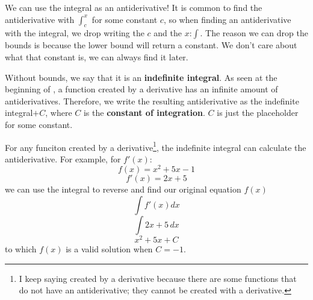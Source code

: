\documentclass[../revisedmain.tex]{subfiles}
\begin{document}
We can use the integral as an antiderivative! It is common to find the antiderivative with $\int_{c}^{x}$ for some constant $c$, so when finding an antiderivative with the integral, we drop writing the $c$ and the $x$:$\int$. The reason we can drop the bounds is because the lower bound will return a constant. We don't care about what that constant is, we can always find it later. \\\par Without bounds, we say that it is an \textbf{indefinite integral}. As seen at the beginning of , a function created by a derivative has an infinite amount of antiderivatives. Therefore, we write the resulting antiderivative as the indefinite integral$+C$, where $C$ is the \textbf{constant of integration}. $C$ is just the placeholder for some constant.\\\par For any funciton created by a derivative\footnote{I keep saying created by a derivative because there are some functions that do not have an antiderivative; they cannot be created with a derivative.}, the indefinite integral can calculate the antiderivative. For example, for $f'(x)$:$$f(x)=x^2+5x-1$$$$f'(x)=2x+5$$we can use the integral to reverse and find our original equation $f(x)$$$\int f'(x)dx$$$$\int 2x+5\,dx$$$$x^2+5x+C$$to which $f(x)$ is a valid solution when $C=-1$.
\end{document}
